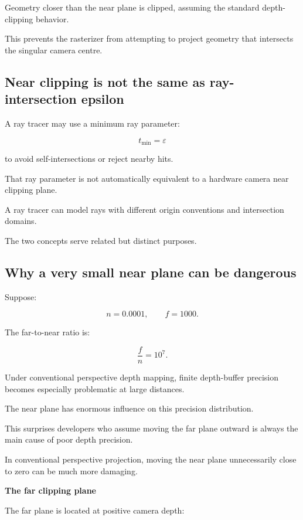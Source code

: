 Geometry closer than the near plane is clipped, assuming the standard depth-clipping behavior.

This prevents the rasterizer from attempting to project geometry that intersects the singular camera centre.

\subsection{Near clipping is not the same as ray-intersection epsilon}\label{02-foundations-ii-ch033-near-clipping-is-not-the-same-as-ray-intersection-epsilon}

A ray tracer may use a minimum ray parameter:

\[
 t_{\min}=\varepsilon
\]

to avoid self-intersections or reject nearby hits.

That ray parameter is not automatically equivalent to a hardware camera near clipping plane.

A ray tracer can model rays with different origin conventions and intersection domains.

The two concepts serve related but distinct purposes.

\subsection{Why a very small near plane can be dangerous}\label{02-foundations-ii-ch033-why-a-very-small-near-plane-can-be-dangerous}

Suppose:

\[
 n=0.0001, \qquad f=1000.
\]

The far-to-near ratio is:

\[
 \frac fn=10^7.
\]

Under conventional perspective depth mapping, finite depth-buffer precision becomes especially problematic at large distances.

The near plane has enormous influence on this precision distribution.

This surprises developers who assume moving the far plane outward is always the main cause of poor depth precision.

In conventional perspective projection, moving the near plane unnecessarily close to zero can be much more damaging.

\textbf{The far clipping plane}

The far plane is located at positive camera depth:

